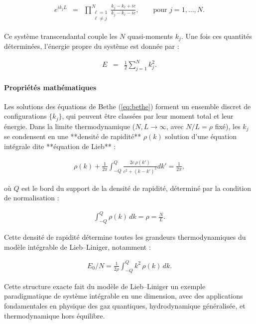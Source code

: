 \begin{eqnarray}
	e^{i k_j L} & = & \prod_{\substack{\ell = 1 \\ \ell \neq j}}^N \frac{k_j - k_\ell + i c}{k_j - k_\ell - i c}, \qquad \text{pour } j = 1, \dots, N. \label{eq:bethe}
\end{eqnarray}

Ce système transcendantal couple les \(N\) quasi-moments \(k_j\). Une fois ces quantités déterminées, l’énergie propre du système est donnée par :

\begin{eqnarray}
	E & = & \frac{1}{2} \sum_{j=1}^N k_j^2.
\end{eqnarray}

\paragraph{Propriétés mathématiques}

Les solutions des équations de Bethe (\ref{eq:bethe}) forment un ensemble discret de configurations \(\{k_j\}\), qui peuvent être classées par leur moment total et leur énergie. Dans la limite thermodynamique (\(N, L \to \infty\), avec \(N/L = \rho\) fixé), les \(k_j\) se condensent en une **densité de rapidité** \(\rho(k)\) solution d’une équation intégrale dite **équation de Lieb** :

\begin{eqnarray}
	\rho(k) + \frac{1}{2\pi} \int_{-Q}^{Q} \frac{2c\, \rho(k')}{c^2 + (k - k')^2} dk' = \frac{1}{2\pi},
\end{eqnarray}

où \(Q\) est le bord du support de la densité de rapidité, déterminé par la condition de normalisation :

\begin{eqnarray}
	\int_{-Q}^{Q} \rho(k)\, dk = \rho = \frac{N}{L}.
\end{eqnarray}

Cette densité de rapidité détermine toutes les grandeurs thermodynamiques du modèle intégrable de Lieb–Liniger, notamment :

\begin{eqnarray}
	E_0/N = \frac{1}{2\rho} \int_{-Q}^{Q} k^2\, \rho(k)\, dk.
\end{eqnarray}

\vspace{1em}
Cette structure exacte fait du modèle de Lieb–Liniger un exemple paradigmatique de système intégrable en une dimension, avec des applications fondamentales en physique des gaz quantiques, hydrodynamique généralisée, et thermodynamique hors équilibre.
